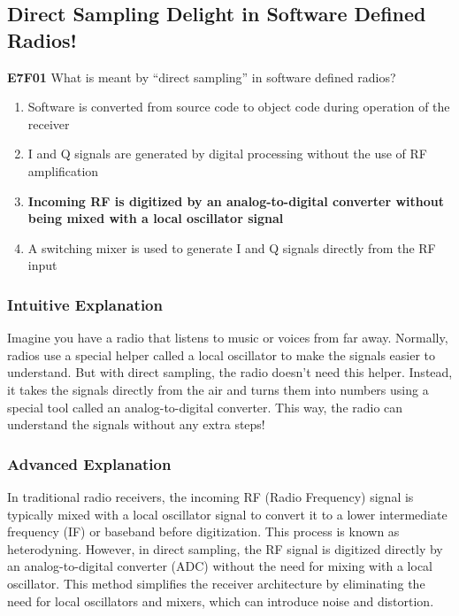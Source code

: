\subsection{Direct Sampling Delight in Software Defined Radios!}

\begin{tcolorbox}[colback=gray!10!white,colframe=black!75!black,title=E7F01]
\textbf{E7F01} What is meant by “direct sampling” in software defined radios?
\begin{enumerate}[label=\Alph*.]
    \item Software is converted from source code to object code during operation of the receiver
    \item I and Q signals are generated by digital processing without the use of RF amplification
    \item \textbf{Incoming RF is digitized by an analog-to-digital converter without being mixed with a local oscillator signal}
    \item A switching mixer is used to generate I and Q signals directly from the RF input
\end{enumerate}
\end{tcolorbox}

\subsubsection*{Intuitive Explanation}
Imagine you have a radio that listens to music or voices from far away. Normally, radios use a special helper called a local oscillator to make the signals easier to understand. But with direct sampling, the radio doesn't need this helper. Instead, it takes the signals directly from the air and turns them into numbers using a special tool called an analog-to-digital converter. This way, the radio can understand the signals without any extra steps!

\subsubsection*{Advanced Explanation}
In traditional radio receivers, the incoming RF (Radio Frequency) signal is typically mixed with a local oscillator signal to convert it to a lower intermediate frequency (IF) or baseband before digitization. This process is known as heterodyning. However, in direct sampling, the RF signal is digitized directly by an analog-to-digital converter (ADC) without the need for mixing with a local oscillator. This method simplifies the receiver architecture by eliminating the need for local oscillators and mixers, which can introduce noise and distortion.

